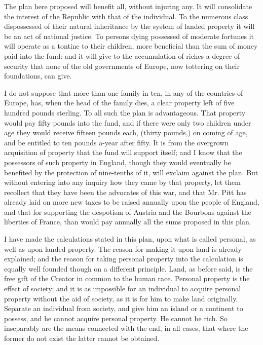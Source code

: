 The plan here proposed will benefit all, without injuring any. It will consolidate the interest of the Republic with that of the individual. To the numerous class dispossessed of their natural inheritance by the system of landed property it will be an act of national justice. To persons dying possessed of moderate fortunes it will operate as a tontine to their children, more beneficial than the sum of money paid into the fund: and it will give to the accumulation of riches a degree of security that none of the old governments of Europe, now tottering on their foundations, can give.\par

I do not suppose that more than one family in ten, in any of the countries of Europe, has, when the head of the family dies, a clear property left of five hundred pounds sterling. To all such the plan is advantageous. That property would pay fifty pounds into the fund, and if there were only two children under age they would receive fifteen pounds each, (thirty pounds,) on coming of age, and be entitled to ten pounds a-year after fifty. It is from the overgrown acquisition of property that the fund will support itself; and I know that the possessors of such property in England, though they would eventually be benefited by the protection of nine-tenths of it, will exclaim against the plan. But without entering into any inquiry how they came by that property, let them recollect that they have been the advocates of this war, and that Mr. Pitt has already laid on more new taxes to be raised annually upon the people of England, and that for supporting the despotism of Austria and the Bourbons against the liberties of France, than would pay annually all the sums proposed in this plan.\par

I have made the calculations stated in this plan, upon what is called personal, as well as upon landed property. The reason for making it upon land is already explained; and the reason for taking personal property into the calculation is equally well founded though on a different principle. Land, as before said, is the free gift of the Creator in common to the human race. Personal property is the effect of society; and it is as impossible for an individual to acquire personal property without the aid of society, as it is for him to make land originally. Separate an individual from society, and give him an island or a continent to possess, and he cannot acquire personal property. He cannot be rich. So inseparably are the means connected with the end, in all cases, that where the former do not exist the latter cannot be obtained.\par

